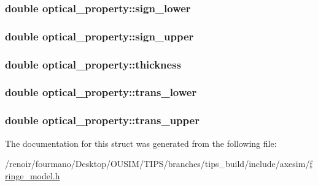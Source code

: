 \hypertarget{structoptical__property_a0aa625d6bded51f0b5e4fcb1a41d8ec1}{
\subsubsection[{sign\_\-lower}]{\setlength{\rightskip}{0pt plus 5cm}double {\bf optical\_\-property::sign\_\-lower}}}
\label{structoptical__property_a0aa625d6bded51f0b5e4fcb1a41d8ec1}
\hypertarget{structoptical__property_afc3a820943b39f39fa102fd3f4fecc18}{
\subsubsection[{sign\_\-upper}]{\setlength{\rightskip}{0pt plus 5cm}double {\bf optical\_\-property::sign\_\-upper}}}
\label{structoptical__property_afc3a820943b39f39fa102fd3f4fecc18}
\hypertarget{structoptical__property_a515a607d457f93bc486e7e90dad7abab}{
\subsubsection[{thickness}]{\setlength{\rightskip}{0pt plus 5cm}double {\bf optical\_\-property::thickness}}}
\label{structoptical__property_a515a607d457f93bc486e7e90dad7abab}
\hypertarget{structoptical__property_a3e8917182777e9314832fd4efd9a2105}{
\subsubsection[{trans\_\-lower}]{\setlength{\rightskip}{0pt plus 5cm}double {\bf optical\_\-property::trans\_\-lower}}}
\label{structoptical__property_a3e8917182777e9314832fd4efd9a2105}
\hypertarget{structoptical__property_a97c5d40160ec802fc519857500e13072}{
\subsubsection[{trans\_\-upper}]{\setlength{\rightskip}{0pt plus 5cm}double {\bf optical\_\-property::trans\_\-upper}}}
\label{structoptical__property_a97c5d40160ec802fc519857500e13072}


The documentation for this struct was generated from the following file:\begin{DoxyCompactItemize}
\item 
/renoir/fourmano/Desktop/OUSIM/TIPS/branches/tips\_\-build/include/axesim/\hyperlink{fringe__model_8h}{fringe\_\-model.h}\end{DoxyCompactItemize}
